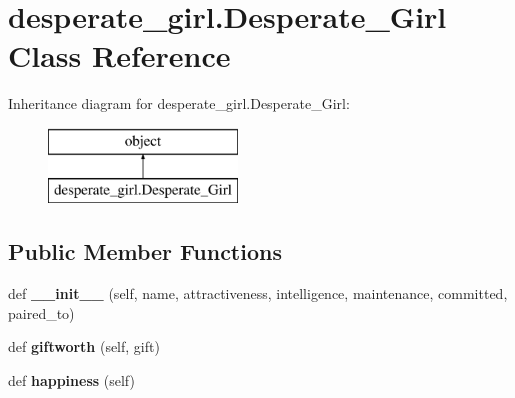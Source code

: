 \hypertarget{classdesperate__girl_1_1_desperate___girl}{}\section{desperate\+\_\+girl.\+Desperate\+\_\+\+Girl Class Reference}
\label{classdesperate__girl_1_1_desperate___girl}
Inheritance diagram for desperate\+\_\+girl.\+Desperate\+\_\+\+Girl\+:\begin{figure}[H]
\begin{center}
\leavevmode
\includegraphics[height=2.000000cm]{classdesperate__girl_1_1_desperate___girl}
\end{center}
\end{figure}
\subsection*{Public Member Functions}
\begin{DoxyCompactItemize}
\item 
\mbox{\label{classdesperate__girl_1_1_desperate___girl_ab79e28f51333e510187e105106ec8dca}} 
def {\bfseries \+\_\+\+\_\+init\+\_\+\+\_\+} (self, name, attractiveness, intelligence, maintenance, committed, paired\+\_\+to)
\item 
\mbox{\label{classdesperate__girl_1_1_desperate___girl_ad840fc289e5dc74f86133a429f3b145d}} 
def {\bfseries giftworth} (self, gift)
\item 
\mbox{\label{classdesperate__girl_1_1_desperate___girl_af80bc07443149f82a9d17d2f86a0c06a}} 
def {\bfseries happiness} (self)
\end{DoxyCompactItemize}

